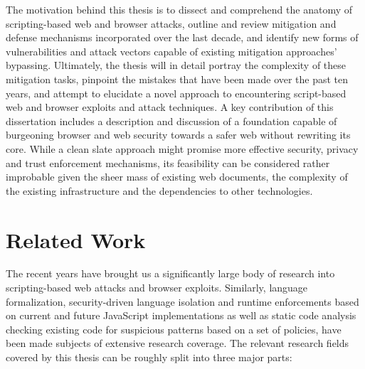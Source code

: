   The motivation behind this thesis is to dissect and comprehend the anatomy of scripting-based web and browser attacks, outline and review mitigation and defense mechanisms incorporated over the last decade, and identify new forms of vulnerabilities and attack vectors capable of existing mitigation approaches' bypassing. Ultimately, the thesis will in detail portray the complexity of these mitigation tasks, pinpoint the mistakes that have been made over the past ten years, and attempt to elucidate a novel approach to encountering script-based web and browser exploits and attack techniques. A key contribution of this dissertation includes a description and discussion of a foundation capable of burgeoning browser and web security towards a safer web without rewriting its core. While a clean slate approach might promise more effective security, privacy and trust enforcement mechanisms, its feasibility can be considered rather improbable given the sheer mass of existing web documents, the complexity of the existing infrastructure and the dependencies to other technologies.\\
  
  
  \section{Related Work}
  \label{subsec:1.3.related_work}

  The recent years have brought us a significantly large body of research into scripting-based web attacks and browser exploits. Similarly, language formalization, security-driven language isolation and runtime enforcements based on current and future JavaScript implementations as well as static code analysis checking existing code for suspicious patterns based on a set of policies, have been made subjects of extensive research coverage. The relevant research fields covered by this thesis can be roughly split into three major parts: 

